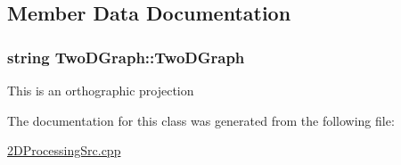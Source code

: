 \subsection{Member Data Documentation}
\subsubsection[{\texorpdfstring{Two\+D\+Graph}{TwoDGraph}}]{\setlength{\rightskip}{0pt plus 5cm}string Two\+D\+Graph\+::\+Two\+D\+Graph\hspace{0.3cm}{\ttfamily [static]}}\hypertarget{classTwoDGraph_a786f5077be86666958f4037e131704be}{}\label{classTwoDGraph_a786f5077be86666958f4037e131704be}
This is an orthographic projection 

The documentation for this class was generated from the following file\+:\begin{DoxyCompactItemize}
\item 
\hyperlink{2DProcessingSrc_8cpp}{2\+D\+Processing\+Src.\+cpp}\end{DoxyCompactItemize}
